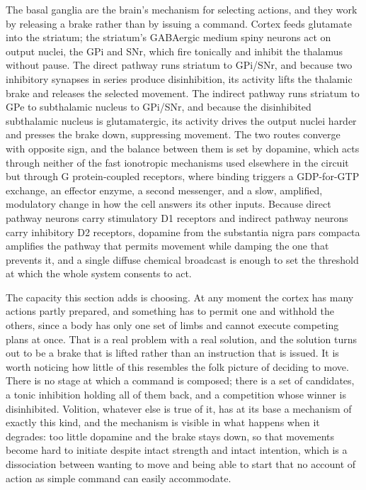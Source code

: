 \documentclass[11pt]{article}
\begin{document}
The basal ganglia are the brain's mechanism for selecting actions, and they work by releasing a brake rather than by issuing a command. Cortex feeds glutamate into the striatum; the striatum's GABAergic medium spiny neurons act on output nuclei, the GPi and SNr, which fire tonically and inhibit the thalamus without pause. The direct pathway runs striatum to GPi/SNr, and because two inhibitory synapses in series produce disinhibition, its activity lifts the thalamic brake and releases the selected movement. The indirect pathway runs striatum to GPe to subthalamic nucleus to GPi/SNr, and because the disinhibited subthalamic nucleus is glutamatergic, its activity drives the output nuclei harder and presses the brake down, suppressing movement. The two routes converge with opposite sign, and the balance between them is set by dopamine, which acts through neither of the fast ionotropic mechanisms used elsewhere in the circuit but through G protein-coupled receptors, where binding triggers a GDP-for-GTP exchange, an effector enzyme, a second messenger, and a slow, amplified, modulatory change in how the cell answers its other inputs. Because direct pathway neurons carry stimulatory D1 receptors and indirect pathway neurons carry inhibitory D2 receptors, dopamine from the substantia nigra pars compacta amplifies the pathway that permits movement while damping the one that prevents it, and a single diffuse chemical broadcast is enough to set the threshold at which the whole system consents to act.

The capacity this section adds is choosing. At any moment the cortex has many actions partly prepared, and something has to permit one and withhold the others, since a body has only one set of limbs and cannot execute competing plans at once. That is a real problem with a real solution, and the solution turns out to be a brake that is lifted rather than an instruction that is issued. It is worth noticing how little of this resembles the folk picture of deciding to move. There is no stage at which a command is composed; there is a set of candidates, a tonic inhibition holding all of them back, and a competition whose winner is disinhibited. Volition, whatever else is true of it, has at its base a mechanism of exactly this kind, and the mechanism is visible in what happens when it degrades: too little dopamine and the brake stays down, so that movements become hard to initiate despite intact strength and intact intention, which is a dissociation between wanting to move and being able to start that no account of action as simple command can easily accommodate.
\end{document}
